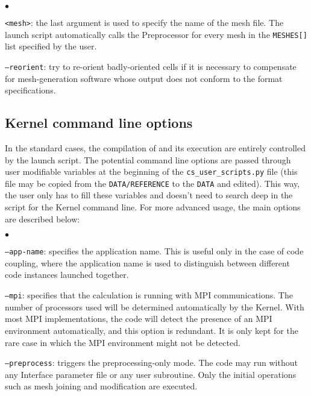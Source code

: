 {{{\begin{list}{$\bullet$}{}
\item \texttt{<mesh>}: the last argument is used to specify the name of the mesh file.
The launch script automatically calls the Preprocessor for every
mesh in the \texttt{MESHES[]} list specified by the user.

\item \texttt{--reorient}: try to re-orient badly-oriented cells
if it is necessary to compensate for mesh-generation software
whose output does not conform to the format specifications.

\end{list}

\subsection{Kernel command line options}
\label{sec:prg_optappelnoy}%
In the standard cases, the compilation of \CS and its execution are entirely
controlled by the launch script. The potential command line options are passed
through user modifiable variables at the beginning of the \texttt{cs\_user\_scripts.py} file
(this file may be copied from the \texttt{DATA/REFERENCE} to the \texttt{DATA} and edited).
This way, the user only has to fill these variables and doesn't need
to search deep in the script for the Kernel command line. For more advanced
usage, the main options are described below:

\begin{list}{$\bullet$}{}
\item \texttt{--app-name}: specifies the application name. This is
useful only in the case of code coupling, where the application name
is used to distinguish between different code instances launched together.

\item \texttt{--mpi}: specifies that the calculation is running
with MPI communications. The number of processors used will be determined
automatically by the Kernel. With most MPI implementations, the
code will detect the presence of an MPI environment automatically, and
this option is redundant. It is only kept for the rare case in which the
MPI environment might not be detected.

\item \texttt{--preprocess}: triggers the preprocessing-only mode.
The code may run without any Interface parameter file or any user subroutine.
Only the initial operations such as mesh joining and modification are
executed.


\end{list}}}}
